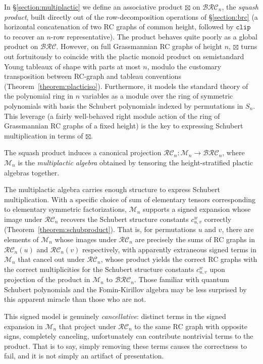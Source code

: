 \documentclass[a4paper,fleqn]{cas-sc}
\theoremstyle{definition}
\theoremstyle{remark}
\numberwithin{equation}{subsection}
\newcommand{\clp}{\mathtt{clip}}
\newcommand{\BRC}{\mathcal{BRC}}
\newcommand{\RC}{\mathcal{RC}}
\begin{document}
In \S\ref{section:multiplactic} we define an associative product $\boxtimes$ on $\BRC_n$, the \emph{squash product}, built directly out of the row-decomposition operations of \S\ref{section:brc} (a horizontal concatenation of two RC graphs of common height, followed by $\clp$ to recover an $n$-row representative). The product behaves quite poorly as a global product on $\BRC$. However, on full Grassmannian RC graphs of height $n$, $\boxtimes$ turns out fortuitously to coincide with the plactic monoid product on semistandard Young tableaux of shape with parts at most $n$, modulo the customary transposition between RC-graph and tableau conventions (Theorem~\ref{theorem:placticiso}). Furthermore, it models the standard theory of the polynomial ring in $n$ variables as a module over the ring of symmetric polynomials with basis the Schubert polynomials indexed by permutations in $S_n$. This leverage (a fairly well-behaved right module action of the ring of Grassmannian RC graphs of a fixed height) is the key to expressing Schubert multiplication in terms of $\boxtimes$. 

The squash product induces a canonical projection $\RC_n:\mathcal{M}_n\to\BRC_n$, where $\mathcal{M}_n$ is the \emph{multiplactic algebra} obtained by tensoring the height-stratified plactic algebras together.

The multiplactic algebra carries enough structure to express Schubert multiplication. With a specific choice of sum of elementary tensors corresponding to elementary symmetric factorizations, $\mathcal{M}_n$ supports a signed expansion whose image under $\RC_n$ recovers the Schubert structure constants $c_{u,v}^w$ correctly (Theorem~\ref{theorem:schubproduct}). That is, for permutations $u$ and $v$, there are elements of $\mathcal{M}_n$ whose images under $\RC_n$ are precisely the sums of RC graphs in $\RC_n(u)$ and $\RC_n(v)$ respectively, with apparently extraneous signed terms in $\mathcal{M}_n$ that cancel out under $\RC_n$, whose product yields the correct RC graphs with the correct multiplicities for the Schubert structure constants $c_{u,v}^w$ upon projection of the product in $\mathcal{M}_n$ to $\BRC_n$. Those familiar with quantum Schubert polynomials and the Fomin-Kirillov algebra may be less surprised by this apparent miracle than those who are not.


This signed model is genuinely \emph{cancellative}: distinct terms in the signed expansion in $\mathcal{M}_n$ that project under $\RC_n$ to the same RC graph with opposite signs, completely canceling, unfortunately can contribute nontrivial terms to the product. That is to say, simply removing these terms causes the correctness to fail, and it is not simply an artifact of presentation.
\end{document}
